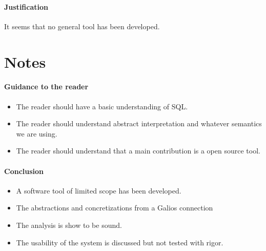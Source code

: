 \paragraph{Justification}

It seems that no general tool has been developed.


\section{Notes}
\paragraph{Guidance to the reader}

\begin{itemize}
    \item The reader should have a basic understanding of SQL.
    \item The reader should understand abstract interpretation and whatever semantics we are using.
    \item The reader should understand that a main contribution is a open source tool.
\end{itemize}

\paragraph{Conclusion}

\begin{itemize}
    \item A software tool of limited scope has been developed.
    \item The abstractions and concretizations from a Galios connection
    \item The analysis is show to be sound.
    \item The usability of the system is discussed but not tested with rigor. 
\end{itemize}







